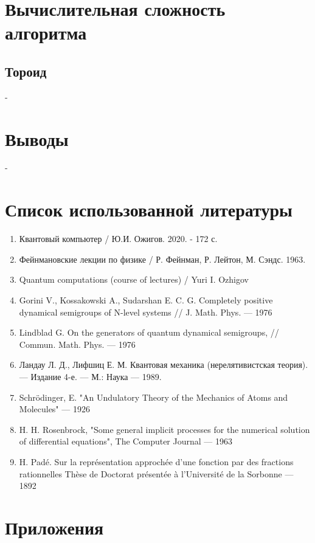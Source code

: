 \documentclass[12pt, a4paper]{article}
\begin{document}
\section{Вычислительная сложность алгоритма}
\subsection{Тороид}
-
\section{Выводы}
-
\section{Список использованной литературы}
\begin{enumerate}
\item Квантовый компьютер / Ю.И. Ожигов. 2020. - 172 с.
\item Фейнмановские лекции по физике / Р. Фейнман, Р. Лейтон, М. Сэндс. 1963.
\item Quantum computations (course of lectures) / Yuri I. Ozhigov
\item Gorini V., Kossakowski A., Sudarshan E. C. G. Completely positive dynamical semigroups of N-level systems // J. Math. Phys. — 1976
\item  Lindblad G. On the generators of quantum dynamical semigroups, // Commun. Math. Phys. — 1976
\item Ландау Л. Д., Лифшиц Е. М. Квантовая механика (нерелятивистская теория). — Издание 4-е. — М.: Наука — 1989.
\item Schrödinger, E. "An Undulatory Theory of the Mechanics of Atoms and Molecules" — 1926
\item H. H. Rosenbrock, "Some general implicit processes for the numerical solution of differential equations", The Computer Journal — 1963 
\item H. Padé. Sur la représentation approchée d’une fonction par des fractions rationnelles Thèse de Doctorat présentée à l’Université de la Sorbonne — 1892

\end{enumerate}
\section{Приложения}
\end{document}
